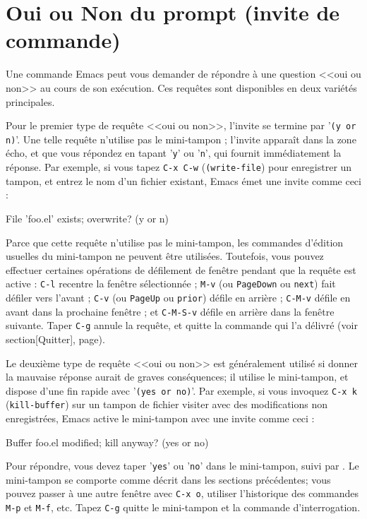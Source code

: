\section{Oui ou Non du prompt (invite de commande)}

Une commande Emacs peut vous demander de répondre à une question <<oui
ou non>> au cours de son exécution. Ces requêtes sont disponibles en
deux variétés principales. 

Pour le premier type de requête <<oui ou non>>, l'invite se termine
par '\texttt{(y or n)}'. Une telle requête n'utilise pas le
mini-tampon ; l'invite apparaît dans la zone écho, et que vous
répondez en tapant '\texttt{y}' ou '\texttt{n}', qui fournit
immédiatement la réponse. Par exemple, si vous tapez \texttt{C-x C-w}
(\texttt{(write-file}) pour enregistrer un tampon, et entrez le nom
d'un fichier existant, Emacs émet une invite comme ceci :
\begin{center}
  \begin{scriptsize}
    {\ttfamily File 'foo.el' exists; overwrite? (y or n)}
  \end{scriptsize}
\end{center}

Parce que cette requête n'utilise pas le mini-tampon, les commandes
d'édition usuelles du mini-tampon ne peuvent être
utilisées. Toutefois, vous pouvez effectuer certaines opérations de
défilement de fenêtre pendant que la requête est active : \texttt{C-l}
recentre la fenêtre sélectionnée ; \texttt{M-v} (ou \texttt{PageDown}
ou \texttt{next}) fait défiler vers l'avant ; \texttt{C-v} (ou
\texttt{PageUp} ou \texttt{prior}) défile en arrière ; \texttt{C-M-v}
défile en avant dans la prochaine fenêtre ; et \texttt{C-M-S-v} défile
en arrière dans la fenêtre suivante. Taper \texttt{C-g} annule la
requête, et quitte la commande qui l'a délivré (voir
section[Quitter], page).

Le deuxième type de requête <<oui ou non>> est généralement utilisé si
donner la mauvaise réponse aurait de graves conséquences; il utilise
le mini-tampon, et dispose d'une fin rapide avec '\texttt{(yes or
  no)}'. Par exemple, si vous invoquez \texttt{C-x k}
(\texttt{kill-buffer}) sur un tampon de fichier visiter avec des
modifications non enregistrées, Emacs active le mini-tampon avec une
invite comme ceci :
\begin{center}
  \begin{scriptsize}
    {\ttfamily Buffer foo.el modified; kill anyway? (yes or no)}
  \end{scriptsize}
\end{center}

Pour répondre, vous devez taper '\texttt{yes}' ou '\texttt{no}' dans
le mini-tampon, suivi par \RET. Le mini-tampon se comporte comme
décrit dans les sections précédentes; vous pouvez passer à une autre
fenêtre avec \texttt{C-x o}, utiliser l'historique des commandes
\texttt{M-p} et \texttt{M-f}, etc. Tapez \texttt{C-g} quitte le
mini-tampon et la commande d'interrogation.